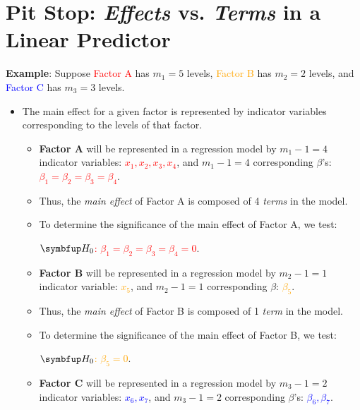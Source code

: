 \section*{Pit Stop: \emph{Effects} vs. \emph{Terms} in a Linear Predictor}
\textbf{Example}: Suppose \textcolor{Red}{Factor A} has $ m_1=5 $ levels, \textcolor{Orange}{Factor B} has $ m_2=2 $ levels,
and \textcolor{Blue}{Factor C} has $ m_3=3 $ levels.
\begin{itemize}
      \item The main effect for a given factor is represented by indicator variables corresponding to the levels of
            that factor.
            \begin{itemize}
                  \item \textbf{Factor A} will be represented in a regression model by $ m_1-1=4 $ indicator variables: \textcolor{Red}{$ x_1,x_2,x_3,x_4 $},
                        and $ m_1-1=4 $ corresponding $ \beta $'s: \textcolor{Red}{$ \beta_1=\beta_2=\beta_3=\beta_4 $}.
                  \item Thus, the \emph{main effect} of Factor A is composed of 4 \emph{terms} in the model.
                  \item To determine the significance of the main effect of Factor A, we test:
                        \begin{tightcenter}
                              \textcolor{Red}{$\HN$: $\beta_1=\beta_2=\beta_3=\beta_4=0$}.
                        \end{tightcenter}
                  \item \textbf{Factor B} will be represented in a regression model by $ m_2-1=1 $ indicator variable: \textcolor{Orange}{$ x_5 $},
                        and $ m_2-1=1 $ corresponding $ \beta $: \textcolor{Orange}{$ \beta_5 $}.
                  \item Thus, the \emph{main effect} of Factor B is composed of 1 \emph{term} in the model.
                  \item To determine the significance of the main effect of Factor B, we test:
                        \begin{tightcenter}
                              \textcolor{Orange}{$\HN$: $\beta_5=0$}.
                        \end{tightcenter}
                  \item \textbf{Factor C} will be represented in a regression model by $ m_3-1=2 $ indicator variables: \textcolor{Blue}{$ x_6,x_7 $},
                        and $ m_3-1=2 $ corresponding $ \beta $'s: \textcolor{Blue}{$ \beta_6,\beta_7 $}.

\end{itemize}
\end{itemize}
